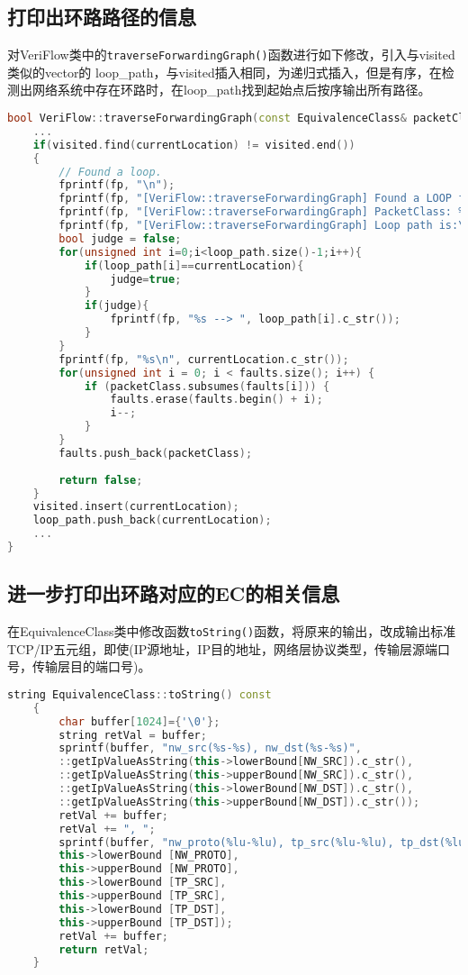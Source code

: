 \documentclass{xjtureport}
\begin{document}
\subsection{打印出环路路径的信息}
对VeriFlow类中的\texttt{traverseForwardingGraph()}函数进行如下修改，引入与visited类似的vector的 loop\_path，与visited插入相同，为递归式插入，但是有序，在检测出网络系统中存在环路时，在loop\_path找到起始点后按序输出所有路径。
\begin{lstlisting}[language=c++]
bool VeriFlow::traverseForwardingGraph(const EquivalenceClass& packetClass, ForwardingGraph* graph, const string& currentLocation, const string& lastHop, unordered_set< string > visited, FILE* fp, vector<string> loop_path){
	...
	if(visited.find(currentLocation) != visited.end())
	{
		// Found a loop.
		fprintf(fp, "\n");
		fprintf(fp, "[VeriFlow::traverseForwardingGraph] Found a LOOP for the following packet class at node %s.\n", currentLocation.c_str());
		fprintf(fp, "[VeriFlow::traverseForwardingGraph] PacketClass: %s\n", packetClass.toString().c_str());
		fprintf(fp, "[VeriFlow::traverseForwardingGraph] Loop path is:\n");
		bool judge = false;
		for(unsigned int i=0;i<loop_path.size()-1;i++){
			if(loop_path[i]==currentLocation){
				judge=true;
			}
			if(judge){
				fprintf(fp, "%s --> ", loop_path[i].c_str());
			}
		}
		fprintf(fp, "%s\n", currentLocation.c_str());
		for(unsigned int i = 0; i < faults.size(); i++) {
			if (packetClass.subsumes(faults[i])) {
				faults.erase(faults.begin() + i);
				i--;
			}
		}
		faults.push_back(packetClass);
		
		return false;
	}
	visited.insert(currentLocation);
	loop_path.push_back(currentLocation);
	...
}
\end{lstlisting}
\subsection{进一步打印出环路对应的EC的相关信息}
在EquivalenceClass类中修改函数\texttt{toString()}函数，将原来的输出，改成输出标准TCP/IP五元组，即使(IP源地址，IP目的地址，网络层协议类型，传输层源端口号，传输层目的端口号)。
\begin{lstlisting}[language=c++]
	string EquivalenceClass::toString() const
	{
		char buffer[1024]={'\0'};
		string retVal = buffer;
		sprintf(buffer, "nw_src(%s-%s), nw_dst(%s-%s)",
		::getIpValueAsString(this->lowerBound[NW_SRC]).c_str(),
		::getIpValueAsString(this->upperBound[NW_SRC]).c_str(),
		::getIpValueAsString(this->lowerBound[NW_DST]).c_str(),
		::getIpValueAsString(this->upperBound[NW_DST]).c_str());
		retVal += buffer;
		retVal += ", ";
		sprintf(buffer, "nw_proto(%lu-%lu), tp_src(%lu-%lu), tp_dst(%lu-%lu)",
		this->lowerBound [NW_PROTO],
		this->upperBound [NW_PROTO],
		this->lowerBound [TP_SRC],
		this->upperBound [TP_SRC],
		this->lowerBound [TP_DST],
		this->upperBound [TP_DST]);
		retVal += buffer;		
		return retVal;
	}
\end{lstlisting}	
\end{document}
